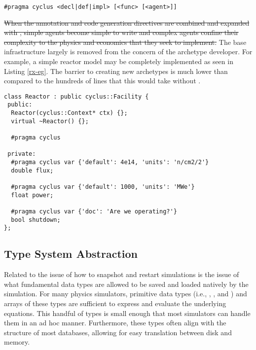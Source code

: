 \begin{lstlisting}[caption={Targeted Code Generation Directive Signatures}, 
                   label=targ-cg]
#pragma cyclus <decl|def|impl> [<func> [<agent>]]
\end{lstlisting}

\sout{When the annotation and code generation directives are combined and expanded with 
\cycpp, simple agents become simple to write and complex agents confine their 
complexity to the physics and economics that they seek to implement.}  The base \cyclus
infrastructure largely is removed from the concern of the archetype developer.
For example, a simple reactor model may be completely implemented as seen in 
Listing \ref{rx-eg}. The barrier to creating new archetypes is much lower than 
compared to the hundreds of lines that this would take without \cycpp.

\begin{lstlisting}[caption={Simple Reactor Archetype}, label=rx-eg]
class Reactor : public cyclus::Facility {
 public:
  Reactor(cyclus::Context* ctx) {};
  virtual ~Reactor() {};

  #pragma cyclus

 private:
  #pragma cyclus var {'default': 4e14, 'units': 'n/cm2/2'}
  double flux;

  #pragma cyclus var {'default': 1000, 'units': 'MWe'}
  float power;

  #pragma cyclus var {'doc': 'Are we operating?'}
  bool shutdown;
};
\end{lstlisting}

\subsection{Type System Abstraction}

Related to the issue of how to snapshot and restart simulations is the issue of 
what fundamental data types are allowed to be saved and loaded natively by the 
simulation. For many physics simulators, primitive data types (i.e., , 
, and ) and arrays of these types are sufficient to 
express and evaluate the underlying equations. This handful of types is small enough 
that most simulators can handle them in an ad hoc manner. Furthermore, these types
often align with the structure of most databases, allowing for easy translation
between disk and memory.

